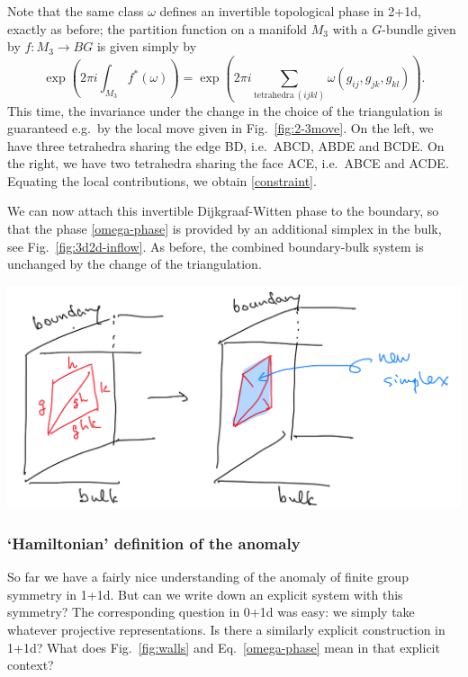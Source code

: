 \documentclass[12pt]{article}
\numberwithin{equation}{section}
\numberwithin{figure}{section}
\theoremstyle{remark}
\renewenvironment{figure}[1][]{
  \begin{originalfigure}[#1]
    \begin{mdframed}[linecolor=black!0,backgroundcolor=black!1]
}{
    \end{mdframed}
  \end{originalfigure}
}
\begin{document}
Note that the same class $\omega$ defines an invertible topological phase in 2+1d,
exactly as before; the partition function on a manifold $M_3$ with a  $G$-bundle
given by $f:M_3\to BG$ is given simply by \begin{equation}
\exp(2\pi i \int_{M_3} f^*(\omega))
= \exp\left(2\pi i \sum_{\text{tetrahedra}\ (ijkl)} \omega(g_{ij},g_{jk},g_{kl})\right).
\end{equation} 
This time, the invariance under the change in the choice of the triangulation 
is guaranteed e.g.~by the local move given in Fig.~\ref{fig:2-3move}.
On the left, we have three tetrahedra sharing the edge BD, i.e.~ABCD, ABDE and BCDE.
On the right, we have two tetrahedra sharing the face ACE, i.e.~ABCE and ACDE.
Equating the local contributions, we obtain \eqref{constraint}.


We can now attach this invertible Dijkgraaf-Witten phase to the boundary,
so that the phase \eqref{omega-phase} is provided by an additional simplex
in the bulk, see Fig.~\ref{fig:3d2d-inflow}.
As before, the combined boundary-bulk system 
is unchanged by the change of the triangulation.

\begin{figure}[h]
\centering
 \includegraphics[scale=.2]{3d2d-inflow.png} 
\caption{Anomaly inflow from 2+1d to 1+1d. \label{fig:3d2d-inflow}}
\end{figure}

\subsubsection{`Hamiltonian' definition of the anomaly}

So far we have a fairly nice understanding of the anomaly of finite group symmetry in 1+1d.
But can we write down an explicit system with this symmetry?
The corresponding question in 0+1d was easy: we simply take whatever projective representations.
Is there a similarly explicit construction in 1+1d?
What does Fig.~\ref{fig:walls} and Eq.~\ref{omega-phase} mean in that explicit context?
\end{document}
